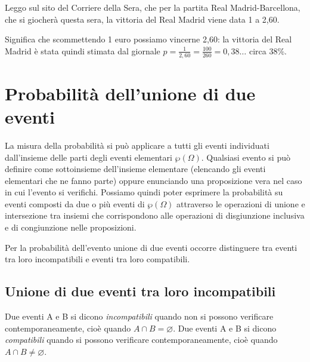 \begin{esempio}
Leggo sul sito del Corriere della Sera, che per la partita Real 
Madrid-Barcellona, che si giocherà questa sera, la vittoria del Real Madrid 
viene data 1 a 2,60.

Significa che scommettendo 1 euro possiamo vincerne 2,60: la vittoria del Real 
Madrid è stata quindi stimata dal giornale $p=\frac 
1{2,60}=\frac{100}{260}=0,38\ldots$ circa 38\%.
\end{esempio}


\section{Probabilità dell'unione di due eventi}
\label{sec:09_unione}

La misura della probabilità si può applicare a tutti gli eventi individuati 
dall'insieme delle parti degli eventi elementari $\wp (\Omega )$. Qualsiasi 
evento si può definire come sottoinsieme dell'insieme elementare (elencando gli 
eventi elementari che ne fanno parte) oppure enunciando una proposizione vera 
nel caso in cui l'evento si verifichi. Possiamo quindi poter esprimere la 
probabilità su eventi composti da due o più eventi di $\wp (\Omega )$ 
attraverso 
le operazioni di unione e intersezione tra insiemi che corrispondono alle 
operazioni di disgiunzione inclusiva e di congiunzione nelle proposizioni.

Per la probabilità dell'evento unione di due eventi occorre distinguere tra 
eventi tra loro incompatibili e eventi tra loro compatibili.

\subsection[Unione di due eventi tra loro incompatibili]{Unione di due eventi 
tra loro incompatibili}

\begin{definizione}
Due eventi A e B si dicono \emph{incompatibili} quando non si possono 
verificare 
contemporaneamente, cioè quando $A\cap B=\varnothing $.
Due eventi A e B si dicono \emph{compatibili} quando si possono verificare 
contemporaneamente, cioè quando $A\cap B\neq \varnothing $.
\end{definizione}

